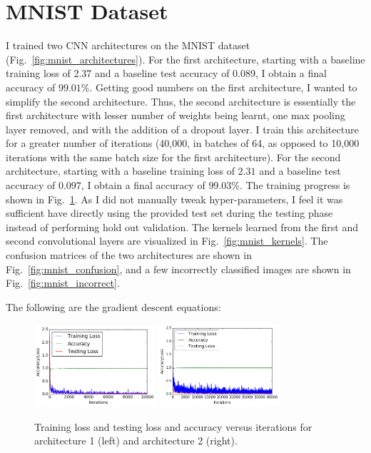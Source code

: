\documentclass[5pt]{article}
\begin{document}
\section{MNIST Dataset}
I trained two CNN architectures on the MNIST dataset
(Fig.~\ref{fig:mnist_architectures}). For the first architecture, starting with
a baseline training loss of 2.37 and a baseline test accuracy of 0.089, I
obtain a final accuracy of $99.01\%$. Getting good numbers on the first
architecture, I wanted to simplify the second architecture. Thus, the second
architecture is essentially the first architecture with lesser number of
weights being learnt, one max pooling layer removed, and with the addition of a
dropout layer. I train this architecture for a greater number of iterations
(40,000, in batches of 64, as opposed to 10,000 iterations with the same batch
size for the first architecture). For the second architecture, starting with a
baseline training loss of $2.31$ and a baseline test accuracy of $0.097$, I
obtain a final accuracy of $99.03\%$. The training progress is shown in
Fig.~\ref{fig:mnist_learning}.  As I did not manually tweak hyper-parameters, I
feel it was sufficient have directly using the provided test set during the
testing phase instead of performing hold out validation.  The kernels learned
from the first and second convolutional layers are visualized in
Fig.~\ref{fig:mnist_kernels}. The confusion matrices of the two architectures
are shown in Fig.~\ref{fig:mnist_confusion}, and a few incorrectly classified
images are shown in Fig.~\ref{fig:mnist_incorrect}.

The following are the gradient descent equations:

\begin{figure}[T]
  \centering{}
  \includegraphics[width=0.4\textwidth]{images/mnist_learning1.png}
  \includegraphics[width=0.4\textwidth]{images/mnist_learning2.png}
  \caption{Training loss and testing loss and accuracy versus iterations for
  architecture 1 (left) and architecture 2 (right).}
\label{fig:mnist_learning}
\end{figure}
\end{document}
